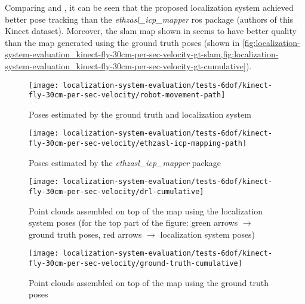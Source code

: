 Comparing  and , it can be seen that the proposed localization system achieved better pose tracking than the \emph{ethzasl\_icp\_mapper} \gls{ros} package \cite{Pomerleau2011} (authors of this Kinect dataset). Moreover, the \gls{slam} map shown in  seems to have better quality than the map generated using the ground truth poses (shown in \cref{fig:localization-system-evaluation_kinect-fly-30cm-per-sec-velocity-gt-slam,fig:localization-system-evaluation_kinect-fly-30cm-per-sec-velocity-gt-cumulative}).

\begin{figure}[H]
	\centering
	\begin{minipage}[b]{0.24\textwidth}
		\centering
		\texttt{[image: localization-system-evaluation/tests-6dof/kinect-fly-30cm-per-sec-velocity/robot-movement-path]}
		\caption{Poses estimated by the ground truth and localization system}
		\label{fig:localization-system-evaluation_kinect_translation_path}
	\end{minipage}\hfill
	\begin{minipage}[b]{0.24\textwidth}
		\centering
		\texttt{[image: localization-system-evaluation/tests-6dof/kinect-fly-30cm-per-sec-velocity/ethzasl-icp-mapping-path]}
		\caption{Poses estimated by the \emph{ethzasl\_icp\_mapper}  package \cite{Pomerleau2011}}
		\label{fig:localization-system-evaluation_kinect_translation_path2}
	\end{minipage}
\end{figure}

\begin{figure}[H]
	\centering
	\texttt{[image: localization-system-evaluation/tests-6dof/kinect-fly-30cm-per-sec-velocity/drl-cumulative]}
	\caption{Point clouds assembled on top of the map using the localization system poses (for the top part of the figure: green arrows $\rightarrow$ ground truth poses, red arrows $\rightarrow$ localization system poses)}
	\label{fig:localization-system-evaluation_kinect-fly-30cm-per-sec-velocity-drl-cumulative}
\end{figure}

\begin{figure}[H]
	\centering
	\texttt{[image: localization-system-evaluation/tests-6dof/kinect-fly-30cm-per-sec-velocity/ground-truth-cumulative]}
	\caption{Point clouds assembled on top of the map using the ground truth poses}
	\label{fig:localization-system-evaluation_kinect-fly-30cm-per-sec-velocity-gt-cumulative}
\end{figure}


